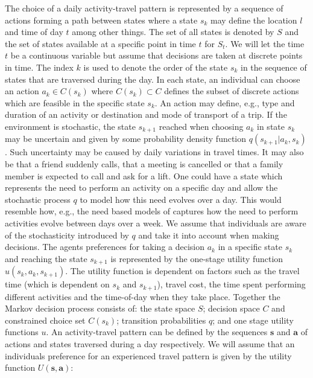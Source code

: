 \newcommand{\bs}{\mathbf{s}}
\newcommand{\ba}{\mathbf{a}}
\newcommand{\avgu}{u}
The choice of a daily activity-travel pattern is represented by a sequence of actions forming a path between states where a state $s_k$ may define the location $l$ and time of day $t$ among other things. The set of all states is denoted by $S$ and the set of states available at a specific point in time $t$ for $S_t$. We will let the time $t$ be a continuous variable but assume that decisions are taken at discrete points in time. The index $k$ is used to denote the order of the state $s_k$ in the sequence of states that are traversed during the day. In each state, an individual can choose an action $a_k \in C(s_k)$ where $C(s_k) \subset C$ defines the subset of discrete actions which are feasible in the specific state $s_k$. An action may define, e.g., type and duration of an activity or destination and mode of transport of a trip. 
If the environment is stochastic, the state $s_{k+1}$ reached when choosing $a_k$ in state $s_k$ may be uncertain and given by some probability density function $q(s_{k+1}|a_k,s_k)$. Such uncertainty may be caused by daily variations in travel times. It may also be that a friend suddenly calls, that a meeting is cancelled or that a family member is expected to call and ask for a lift. One could have a state which represents the need to perform an activity on a specific day and allow the stochastic process $q$ to model how this need evolves over a day. This would resemble how, e.g., the need based models of \citet{arentze11} captures how the need to perform activities evolve between days over a week. 
We assume that individuals are aware of the stochasticity introduced by $q$ and take it into account when making decisions. The agents preferences for taking a decision $a_k$ in a specific state $s_k$ and reaching the state $s_{k+1}$ is represented by the one-stage utility function $u(s_k,a_k,s_{k+1})$. The utility function is dependent on factors such as the travel time (which is dependent on $s_k$ and $s_{k+1}$), travel cost, the time spent performing different activities and the time-of-day when they take place. Together the Markov decision process consists of: the state space $S$; decision space $C$ and constrained choice set $C(s_k)$; transition probabilities $q$; and one stage utility functions $u$. An activity-travel pattern can be defined by the sequences $\bs$ and $\ba$ of actions and states traversed during a day respectively. We will assume that an individuals preference for an experienced travel pattern is given by the utility function $U(\bs,\ba)$:
